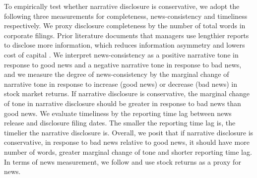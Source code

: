 \documentclass[a4paper]{article}
\begin{document}
\begin{spacing}{2}
To empirically test whether narrative disclosure is conservative, we adopt the following three measurements for completeness, news-consistency and timeliness respectively. We proxy disclosure completeness by the number of total words in corporate filings. Prior literature documents that managers use lengthier reports to disclose more information, which reduces information asymmetry and lowers cost of capital . We interpret news-consistency as a positive narrative tone in response to good news and a negative narrative tone in response to bad news, and we measure the degree of news-consistency by the marginal change of narrative tone in response to increase (good news) or decrease (bad news) in stock market returns. If narrative disclosure is conservative, the marginal change of tone in narrative disclosure should be greater in response to bad news than good news. We evaluate timeliness by the reporting time lag between news release and disclosure filing dates. The smaller the reporting time lag is, the timelier the narrative disclosure is. Overall, we posit that if narrative disclosure is conservative, in response to bad news relative to good news, it should have more number of words, greater marginal change of tone and shorter reporting time lag. In terms of news measurement, we follow  and use stock returns as a proxy for news.


\end{spacing}
\end{document}
